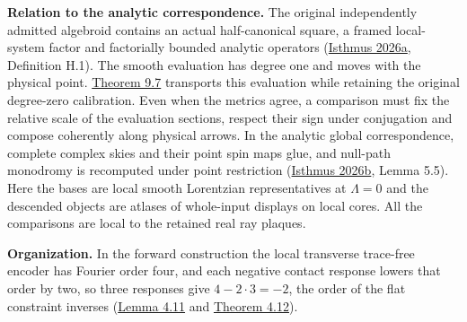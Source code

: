 \documentclass[
  english,
  11pt,
  reqno]{amsart}
\begin{document}
\textbf{Relation to the analytic correspondence.} The original
independently admitted algebroid contains an actual half-canonical
square, a framed local-system factor and factorially bounded analytic
operators (\hyperref[ref-IsthmusLocal2026]{Isthmus 2026a}, Definition
H.1). The smooth evaluation has degree one and moves with the physical
point. \hyperref[thm:analytic-structured-wave-comparison]{Theorem 9.7}
transports this evaluation while retaining the original degree-zero
calibration. Even when the metrics agree, a comparison must fix the
relative scale of the evaluation sections, respect their sign under
conjugation and compose coherently along physical arrows. In the
analytic global correspondence, complete complex skies and their point
spin maps glue, and null-path monodromy is recomputed under point
restriction (\hyperref[ref-IsthmusGlobal2026]{Isthmus 2026b}, Lemma
5.5). Here the bases are local smooth Lorentzian representatives at
\(\Lambda=0\) and the descended objects are atlases of whole-input
displays on local cores. All the comparisons are local to the retained
real ray plaques.

\textbf{Organization.} In the forward construction the local transverse
trace-free encoder has Fourier order four, and each negative contact
response lowers that order by two, so three responses give
\(4-2\cdot3=-2\), the order of the flat constraint inverses
(\hyperref[lem:online-negative-response-intermediate-orders]{Lemma 4.11}
and \hyperref[thm:online-negative-response-flat-green]{Theorem 4.12}).
\end{document}

